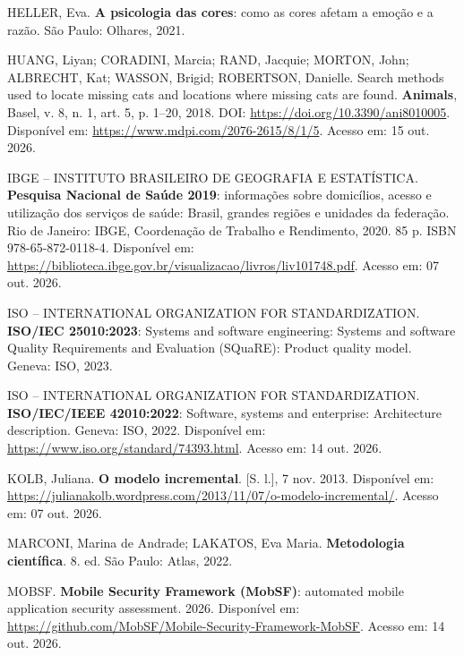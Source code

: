 \begin{flushleft}
\vspace{12pt}
\noindent HELLER, Eva. \textbf{A psicologia das cores}: como as cores afetam a emoção e a razão. São Paulo: Olhares, 2021.

\vspace{12pt}
\noindent HUANG, Liyan; CORADINI, Marcia; RAND, Jacquie; MORTON, John; ALBRECHT, Kat; WASSON, Brigid; ROBERTSON, Danielle. Search methods used to locate missing cats and locations where missing cats are found. \textbf{Animals}, Basel, v. 8, n. 1, art. 5, p. 1--20, 2018. DOI: \url{https://doi.org/10.3390/ani8010005}. Disponível em: \url{https://www.mdpi.com/2076-2615/8/1/5}. Acesso em: 15 out. 2026.

\vspace{12pt}
\noindent IBGE -- INSTITUTO BRASILEIRO DE GEOGRAFIA E ESTATÍSTICA. \textbf{Pesquisa Nacional de Saúde 2019}: informações sobre domicílios, acesso e utilização dos serviços de saúde: Brasil, grandes regiões e unidades da federação. Rio de Janeiro: IBGE, Coordenação de Trabalho e Rendimento, 2020. 85 p. ISBN 978-65-872-0118-4. Disponível em: \url{https://biblioteca.ibge.gov.br/visualizacao/livros/liv101748.pdf}. Acesso em: 07 out. 2026.

\vspace{12pt}
\noindent ISO -- INTERNATIONAL ORGANIZATION FOR STANDARDIZATION. \textbf{ISO/IEC 25010:2023}: Systems and software engineering: Systems and software Quality Requirements and Evaluation (SQuaRE): Product quality model. Geneva: ISO, 2023.

\vspace{12pt}
\noindent ISO -- INTERNATIONAL ORGANIZATION FOR STANDARDIZATION. \textbf{ISO/IEC/IEEE 42010:2022}: Software, systems and enterprise: Architecture description. Geneva: ISO, 2022. Disponível em: \url{https://www.iso.org/standard/74393.html}. Acesso em: 14 out. 2026.

\vspace{12pt}
\noindent KOLB, Juliana. \textbf{O modelo incremental}. [S. l.], 7 nov. 2013. Disponível em: \url{https://julianakolb.wordpress.com/2013/11/07/o-modelo-incremental/}. Acesso em: 07 out. 2026.

\vspace{12pt}
\noindent MARCONI, Marina de Andrade; LAKATOS, Eva Maria. \textbf{Metodologia científica}. 8. ed. São Paulo: Atlas, 2022.

\vspace{12pt}
\noindent MOBSF. \textbf{Mobile Security Framework (MobSF)}: automated mobile application security assessment. 2026. Disponível em: \url{https://github.com/MobSF/Mobile-Security-Framework-MobSF}. Acesso em: 14 out. 2026.


\end{flushleft}
